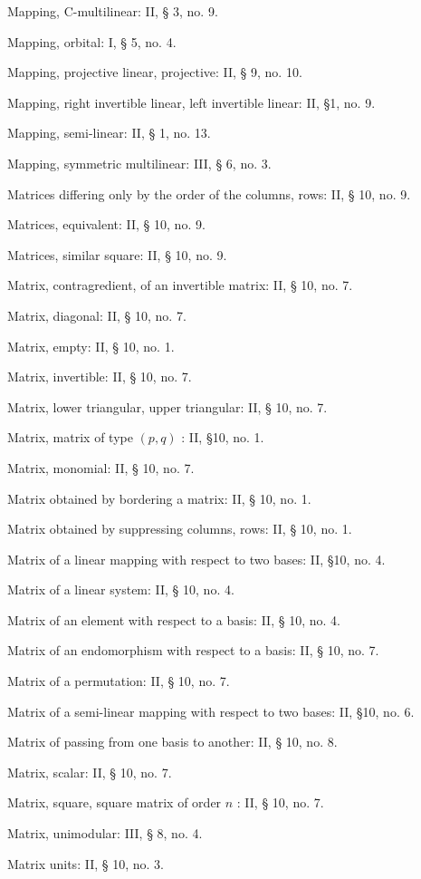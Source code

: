Mapping, C-multilinear: II, § 3, no. 9.

Mapping, orbital: I, § 5, no. 4.

Mapping, projective linear, projective: II, § 9, no. 10.

Mapping, right invertible linear, left invertible linear: II, §1, no. 9.

Mapping, semi-linear: II, § 1, no. 13.

Mapping, symmetric multilinear: III, § 6, no. 3.

Matrices differing only by the order of the columns, rows: II, § 10, no. 9.

Matrices, equivalent: II, § 10, no. 9.

Matrices, similar square: II, § 10, no. 9.

Matrix, contragredient, of an invertible matrix: II, § 10, no. 7.

Matrix, diagonal: II, § 10, no. 7.

Matrix, empty: II, § 10, no. 1.

Matrix, invertible: II, § 10, no. 7.

Matrix, lower triangular, upper triangular: II, § 10, no. 7.

Matrix, matrix of type \((p,q)\) : II, §10, no. 1.

Matrix, monomial: II, § 10, no. 7.

Matrix obtained by bordering a matrix: II, § 10, no. 1.

Matrix obtained by suppressing columns, rows: II, § 10, no. 1.

Matrix of a linear mapping with respect to two bases: II, §10, no. 4.

Matrix of a linear system: II, § 10, no. 4.

Matrix of an element with respect to a basis: II, § 10, no. 4.

Matrix of an endomorphism with respect to a basis: II, § 10, no. 7.

Matrix of a permutation: II, § 10, no. 7.

Matrix of a semi-linear mapping with respect to two bases: II, §10, no. 6.

Matrix of passing from one basis to another: II, § 10, no. 8.

Matrix, scalar: II, § 10, no. 7.

Matrix, square, square matrix of order \(n\) : II, § 10, no. 7.

Matrix, unimodular: III, § 8, no. 4.

Matrix units: II, § 10, no. 3.

